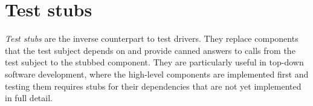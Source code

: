 \section{Test stubs}
\textit{Test stubs} are the inverse counterpart to test drivers.
They replace components that the test subject depends on
and provide canned answers to calls from the test subject to the stubbed component.
\autocite{MocksArentStubs}
They are particularly useful in top-down software development,
where the high-level components are implemented first
and testing them requires stubs for their dependencies
that are not yet implemented in full detail.

